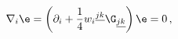 \begin{equation} \label{constant}
\nabla_i \e=\left(\partial_i + {1\over 4} w_i{}^{\underline{jk}}
\G_{\underline{jk}} \right)\e=0\,,
\end{equation}


